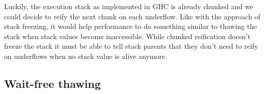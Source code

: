 Luckily, the execution stack as implemented in GHC is already chunked
and we could decide to reify the next chunk on each underflow. Like with
the approach of stack freezing, it would help performance to do something similar
to thawing the stack when stack values become inaccessible. While
chunked reification doesn't freeze the stack it must be able to tell
stack parents that they don't need to reify on underflows when no stack
value is alive anymore.

\subsection{Wait-free thawing} \label{sec:wait-free_thawing}
